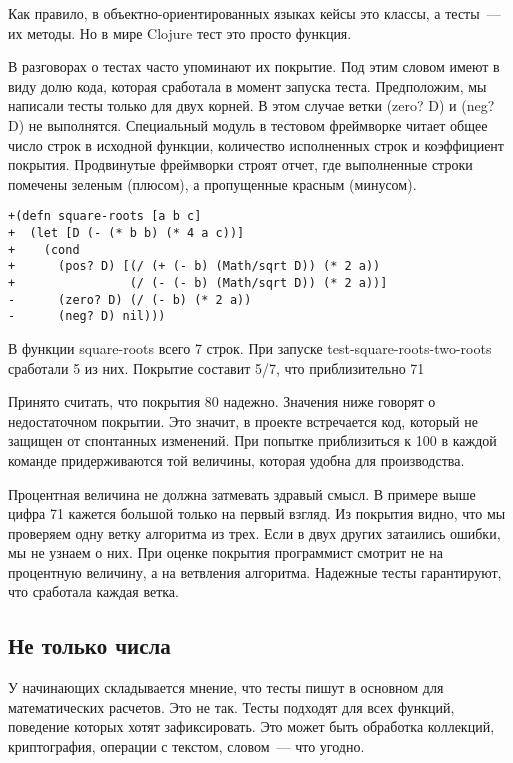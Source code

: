 Как правило, в объектно-ориентированных языках кейсы это классы, а тесты~--- их
методы. Но в мире Clojure тест это просто функция.

В разговорах о тестах часто упоминают их покрытие. Под этим словом имеют в виду
долю кода, которая сработала в момент запуска теста. Предположим, мы написали
тесты только для двух корней. В этом случае ветки (zero? D) и (neg? D) не
выполнятся. Специальный модуль в тестовом фреймворке читает общее число строк в
исходной функции, количество исполненных строк и коэффициент
покрытия. Продвинутые фреймворки строят отчет, где выполненные строки помечены
зеленым (плюсом), а пропущенные красным (минусом).

\begin{verbatim}
+(defn square-roots [a b c]
+  (let [D (- (* b b) (* 4 a c))]
+    (cond
+      (pos? D) [(/ (+ (- b) (Math/sqrt D)) (* 2 a))
+                (/ (- (- b) (Math/sqrt D)) (* 2 a))]
-      (zero? D) (/ (- b) (* 2 a))
-      (neg? D) nil)))
\end{verbatim}

В функции square-roots всего 7 строк. При запуске test-square-roots-two-roots
сработали 5 из них. Покрытие составит 5/7, что приблизительно 71%

Принято считать, что покрытия 80%
надежно. Значения ниже говорят о недостаточном покрытии. Это значит, в проекте
встречается код, который не защищен от спонтанных изменений. При попытке
приблизиться к 100%
в каждой команде придерживаются той величины, которая удобна для производства.


Процентная величина не должна затмевать здравый смысл. В примере выше цифра 71%
кажется большой только на первый взгляд. Из покрытия видно, что мы проверяем
одну ветку алгоритма из трех. Если в двух других затаились ошибки, мы не узнаем
о них. При оценке покрытия программист смотрит не на процентную величину, а на
ветвления алгоритма. Надежные тесты гарантируют, что сработала каждая ветка.

\subsection{Не только числа}

У начинающих складывается мнение, что тесты пишут в основном для математических
расчетов. Это не так. Тесты подходят для всех функций, поведение которых хотят
зафиксировать. Это может быть обработка коллекций, криптография, операции с
текстом, словом~--- что угодно.

